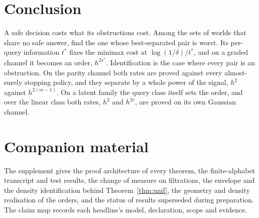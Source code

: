 \section{Conclusion}

A safe decision costs what its obstructions cost. Among the sets of worlds that share no safe
answer, find the one whose best-separated pair is worst. Its per-query information $t^{*}$
fixes the minimax cost at $\log(1/\delta)/t^{*}$, and on a graded channel it becomes an order,
$h^{2s^{*}}$. Identification is the case where every pair is an obstruction. On the parity
channel both rates are proved against every almost-surely stopping policy, and they separate
by a whole power of the signal, $h^{2}$ against $h^{2(m-1)}$. On a latent family the query
class itself sets the order, and over the linear class both rates, $h^{2}$ and $h^{2r}$, are
proved on its own Gaussian channel.

\section*{Companion material}
The supplement gives the proof architecture of every theorem, the finite-alphabet transcript and
test results, the change of measure on filtrations, the envelope and the density identification
behind Theorem~\ref{thm:unif}, the geometry and density realisation of the orders, and the status
of results superseded during preparation. The claim map records each headline's model,
declaration, scope and evidence.

